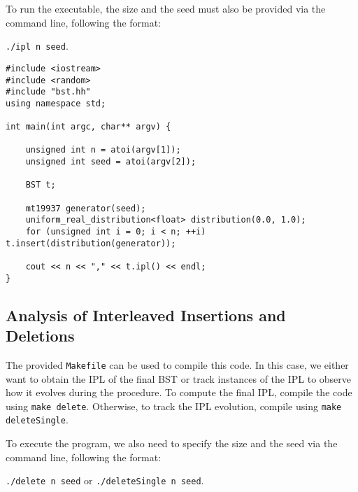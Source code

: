 To run the executable, the size and the seed must also be provided via the command line, following the format:  

\texttt{./ipl n seed}.

\begin{verbatim}
#include <iostream>
#include <random>
#include "bst.hh"
using namespace std;

int main(int argc, char** argv) {

    unsigned int n = atoi(argv[1]);
    unsigned int seed = atoi(argv[2]);

    BST t;

    mt19937 generator(seed);
    uniform_real_distribution<float> distribution(0.0, 1.0);
    for (unsigned int i = 0; i < n; ++i) t.insert(distribution(generator));
    
    cout << n << "," << t.ipl() << endl;
}
\end{verbatim}

\subsection{Analysis of Interleaved Insertions and Deletions}
The provided \texttt{Makefile} can be used to compile this code. In this case, we either want to obtain the IPL of the final BST or track instances of the IPL to observe how it evolves during the procedure. To compute the final IPL, compile the code using \texttt{make delete}. Otherwise, to track the IPL evolution, compile using \texttt{make deleteSingle}.  

To execute the program, we also need to specify the size and the seed via the command line, following the format:  

\texttt{./delete n seed} \quad or \quad \texttt{./deleteSingle n seed}.

